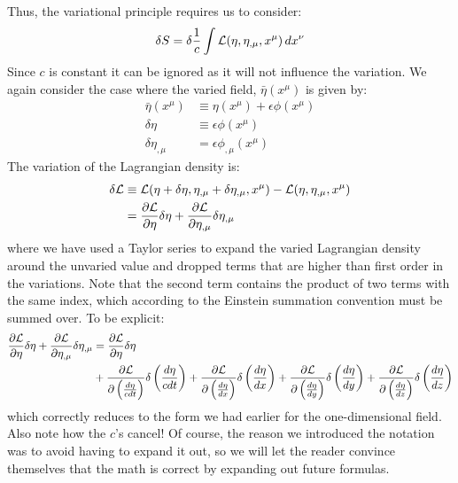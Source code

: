 Thus, the variational principle requires us to consider:
\begin{align}
\delta S=\delta \frac{1}{c} \int \mathcal{L}(\eta,\eta_{,\mu},x^\mu) \,dx^\nu
\end{align}
Since $c$ is constant it can be ignored as it will not influence the variation. We again consider the case where the varied field, $\bar\eta(x^\mu)$ is given by:
\begin{align}
\bar\eta(x^\mu)&\equiv\eta(x^\mu)+\epsilon\phi(x^\mu)\nonumber\\
\delta \eta&\equiv\epsilon\phi(x^\mu)\nonumber\\
\delta \eta_{,\mu}&=\epsilon\phi_{,\mu}(x^\mu)
\end{align}
The variation of the Lagrangian density is:
\begin{align}
\delta \mathcal{L} &\equiv \mathcal{L}(\eta+\delta\eta,\eta_{,\mu}+\delta\eta_{,\mu},x^\mu)-\mathcal{L}(\eta,\eta_{,\mu},x^\mu)\nonumber\\
&=\frac{\partial \mathcal{L}}{\partial \eta}\delta\eta+\frac{\partial \mathcal{L}}{\partial \eta_{,\mu}}\delta\eta_{,\mu}
\end{align}
where we have used a Taylor series to expand the varied Lagrangian density around the unvaried value and dropped terms that are higher than first order in the variations. Note that the second term contains the product of two terms with the same index, which according to the Einstein summation convention must be summed over. To be explicit:
\begin{align}
\frac{\partial \mathcal{L}}{\partial \eta}\delta\eta+\frac{\partial \mathcal{L}}{\partial \eta_{,\mu}}\delta\eta_{,\mu}&=\frac{\partial \mathcal{L}}{\partial \eta}\delta\eta\nonumber\\
&+\frac{\partial \mathcal{L}}{\partial \left(\frac{d\eta}{cdt}\right)}\delta\left(\frac{d\eta}{cdt}\right)+\frac{\partial \mathcal{L}}{\partial \left(\frac{d\eta}{dx}\right)}\delta\left(\frac{d\eta}{dx}\right)+\frac{\partial \mathcal{L}}{\partial \left(\frac{d\eta}{dy}\right)}\delta\left(\frac{d\eta}{dy}\right)+\frac{\partial \mathcal{L}}{\partial \left(\frac{d\eta}{dz}\right)}\delta\left(\frac{d\eta}{dz}\right)
\end{align}
which correctly reduces to the form we had earlier for the one-dimensional field. Also note how the $c$'s cancel! Of course, the reason we introduced the notation was to avoid having to expand it out, so we will let the reader convince themselves that the math is correct by expanding out future formulas.

